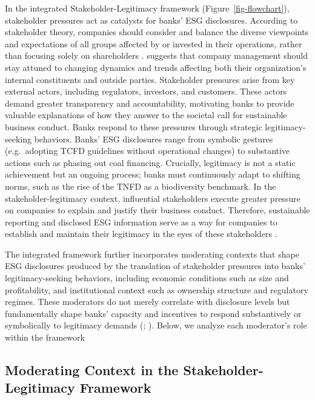 \documentclass[
  authoryear]{elsarticle}
\begin{document}
In the integrated Stakeholder-Legitimacy framework
(Figure~\ref{fig-flowchart}), stakeholder pressures act as catalysts for
banks' ESG disclosures. According to stakeholder theory, companies
should consider and balance the diverse viewpoints and expectations of
all groups affected by or invested in their operations, rather than
focusing solely on shareholders \citep{BUCHHOLZ2005, LAPLUME2008}.
\citet{FREEMAN1984} suggests that company management should stay attuned
to changing dynamics and trends affecting both their organization's
internal constituents and outside parties. Stakeholder pressures arise
from key external actors, including regulators, investors, and
customers. These actors demand greater transparency and accountability,
motivating banks to provide valuable explanations of how they answer to
the societal call for sustainable business conduct. Banks respond to
these pressures through strategic legitimacy-seeking behaviors. Banks'
ESG disclosures range from symbolic gestures (e.g.~adopting TCFD
guidelines without operational changes) to substantive actions such as
phasing out coal financing. Crucially, legitimacy is not a static
achievement but an ongoing process; banks must continuously adapt to
shifting norms, such as the rise of the TNFD as a biodiversity
benchmark. In the stakeholder-legitimacy context, influential
stakeholders execute greater pressure on companies to explain and
justify their business conduct. Therefore, sustainable reporting and
disclosed ESG information serve as a way for companies to establish and
maintain their legitimacy in the eyes of these stakeholders
\citep{CAMPBELL_D2003}.

The integrated framework further incorporates moderating contexts that
shape ESG disclosures produced by the translation of stakeholder
pressures into banks' legitimacy-seeking behaviors, including economic
conditions such as size and profitability, and institutional context
such as ownership structure and regulatory regimes. These moderators do
not merely correlate with disclosure levels but fundamentally shape
banks' capacity and incentives to respond substantively or symbolically
to legitimacy demands (\citet{CAMPBELL2007}; \citet{AGUINIS2012}).
Below, we analyze each moderator's role within the framework

\subsection{Moderating Context in the Stakeholder-Legitimacy
Framework}\label{moderating-context-in-the-stakeholder-legitimacy-framework}
\end{document}
